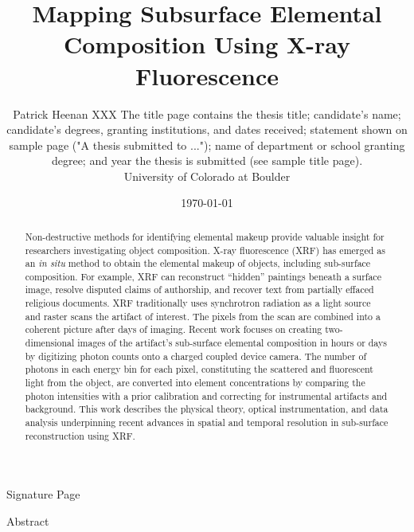 \documentclass[%
  aip,12pt,tightenlines,
  amsthm,
 amsmath,amssymb
]{article}
\newcommand{\firstp}[0]{}
\begin{document}
\singlespacing


\title{Mapping Subsurface Elemental Composition Using X-ray Fluorescence}
\date{\today}
\author{Patrick Heenan XXX The title page contains the thesis title; candidate's name; candidate's degrees, granting institutions, and dates received; statement shown on sample page ("A thesis submitted to ..."); name of department or school granting degree; and year the thesis is submitted (see sample title page).
 \\  University of Colorado at Boulder }

\maketitle
\thispagestyle{empty}


\clearpage

Signature Page

\clearpage

Abstract

\begin{abstract}

\firstp Non-destructive methods for identifying elemental makeup provide valuable insight for researchers investigating object composition. X-ray fluorescence (XRF) has emerged as an \emph{in situ} method to obtain the elemental makeup of objects, including sub-surface composition. For example, XRF can reconstruct “hidden” paintings beneath a surface image, resolve disputed claims of authorship, and recover text from partially effaced religious documents. XRF traditionally uses synchrotron radiation as a light source and raster scans the artifact of interest. The pixels from the scan are combined into a coherent picture after days of imaging. Recent work focuses on creating two-dimensional images of the artifact's sub-surface elemental composition in hours or days by digitizing photon counts onto a charged coupled device camera. The number of photons in each energy bin for each pixel, constituting the scattered and fluorescent light from the object, are converted into element concentrations by comparing the photon intensities with a prior calibration and correcting for instrumental artifacts and background. This work describes the physical theory, optical instrumentation, and data analysis underpinning recent advances in spatial and temporal resolution in sub-surface reconstruction using XRF. 
\end{abstract}
\end{document}
